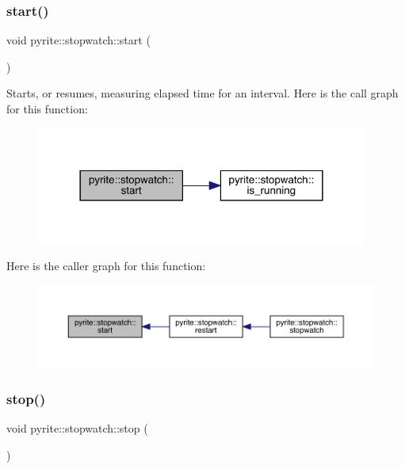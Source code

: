 \subsubsection{\texorpdfstring{start()}{start()}}
{\footnotesize\ttfamily void pyrite\+::stopwatch\+::start (\begin{DoxyParamCaption}{ }\end{DoxyParamCaption})\hspace{0.3cm}{\ttfamily [inline]}}

Starts, or resumes, measuring elapsed time for an interval. Here is the call graph for this function\+:
\nopagebreak
\begin{figure}[H]
\begin{center}
\leavevmode
\includegraphics[width=309pt]{d6/dd1/classpyrite_1_1stopwatch_ae1f6baec67daf518cf4d6bfbaab43cb1_cgraph}
\end{center}
\end{figure}
Here is the caller graph for this function\+:
\nopagebreak
\begin{figure}[H]
\begin{center}
\leavevmode
\includegraphics[width=350pt]{d6/dd1/classpyrite_1_1stopwatch_ae1f6baec67daf518cf4d6bfbaab43cb1_icgraph}
\end{center}
\end{figure}
\mbox{\label{classpyrite_1_1stopwatch_acfacb195247f465f29cedaa9e8686e82}} 
\subsubsection{\texorpdfstring{stop()}{stop()}}
{\footnotesize\ttfamily void pyrite\+::stopwatch\+::stop (\begin{DoxyParamCaption}{ }\end{DoxyParamCaption})\hspace{0.3cm}{\ttfamily [inline]}}

